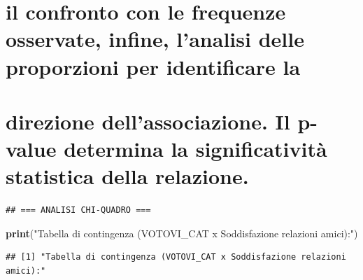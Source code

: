 \documentclass[
]{article}
\newenvironment{Shaded}{\begin{snugshade}}{\end{snugshade}}
\newcommand{\AlertTok}[1]{\textcolor[rgb]{0.94,0.16,0.16}{#1}}
\newcommand{\CommentTok}[1]{\textcolor[rgb]{0.56,0.35,0.01}{\textit{#1}}}
\newcommand{\FunctionTok}[1]{\textcolor[rgb]{0.13,0.29,0.53}{\textbf{#1}}}
\newcommand{\NormalTok}[1]{#1}
\newcommand{\OtherTok}[1]{\textcolor[rgb]{0.56,0.35,0.01}{#1}}
\newcommand{\SpecialCharTok}[1]{\textcolor[rgb]{0.81,0.36,0.00}{\textbf{#1}}}
\newcommand{\StringTok}[1]{\textcolor[rgb]{0.31,0.60,0.02}{#1}}
\begin{document}
\section{il confronto con le frequenze osservate, infine, l'analisi
delle proporzioni per identificare
la}\label{il-confronto-con-le-frequenze-osservate-infine-lanalisi-delle-proporzioni-per-identificare-la}

\section{direzione dell'associazione. Il p-value determina la
significatività statistica della
relazione.}\label{direzione-dellassociazione.-il-p-value-determina-la-significativituxe0-statistica-della-relazione.}

\begin{Shaded}
\end{Shaded}

\begin{verbatim}
## === ANALISI CHI-QUADRO ===
\end{verbatim}

\begin{Shaded}
\begin{Highlighting}[]
\FunctionTok{print}\NormalTok{(}\StringTok{"Tabella di contingenza (VOTOVI\_CAT x Soddisfazione relazioni amici):"}\NormalTok{)}
\end{Highlighting}
\end{Shaded}

\begin{verbatim}
## [1] "Tabella di contingenza (VOTOVI_CAT x Soddisfazione relazioni amici):"
\end{verbatim}
\end{document}
